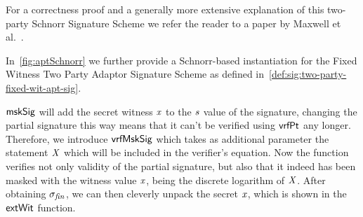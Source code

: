 For a correctness proof and a generally more extensive explanation of this two-party Schnorr Signature Scheme we refer the reader to a paper by Maxwell et al.~\cite{maxwell2019simple}.

In~\cref{fig:aptSchnorr} we further provide a Schnorr-based instantiation for the Fixed Witness Two Party Adaptor Signature Scheme as defined in~\cref{def:sig:two-party-fixed-wit-apt-sig}.

$\mathsf{mskSig}$ will add the secret witness $\mathit{x}$ to the $\mathit{s}$ value of the signature, changing the partial signature this way means that it can't be verified using $\mathsf{vrfPt}$ any longer.
Therefore, we introduce $\mathsf{vrfMskSig}$ which takes as additional parameter the statement $\mathit{X}$ which will be included in the verifier's equation.
Now the function verifies not only validity of the partial signature, but also that it indeed has been masked with the witness value $\mathit{x}$, being the discrete logarithm of $\mathit{X}$.
After obtaining $\sigma_{\mathit{fin}}$, we can then cleverly unpack the secret $\mathit{x}$, which is shown in the $\mathsf{extWit}$ function.

